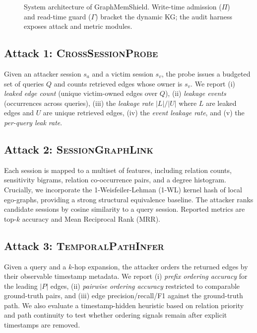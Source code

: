 \documentclass[journal,10pt,twocolumn]{IEEEtran}
\begin{document}
\begin{figure}[t]
    \caption{System architecture of GraphMemShield. Write-time
    admission ($\Pi$) and read-time guard ($\Gamma$) bracket the
    dynamic KG; the audit harness exposes attack and metric modules.}
    \label{fig:arch}
\end{figure}

\subsection{Attack 1: \textsc{CrossSessionProbe}}
Given an attacker session $s_a$ and a victim session $s_v$, the probe
issues a budgeted set of queries $Q$ and counts retrieved edges whose
owner is $s_v$. We report (i) \emph{leaked edge count} (unique
victim-owned edges over $Q$), (ii) \emph{leakage events} (occurrences
across queries), (iii) the \emph{leakage rate}
$|L|/|U|$ where $L$ are leaked edges and $U$ are unique retrieved
edges, (iv) the \emph{event leakage rate}, and (v) the
\emph{per-query leak rate}.

\subsection{Attack 2: \textsc{SessionGraphLink}}
Each session is mapped to a multiset of features, including relation
counts, sensitivity bigrams, relation co-occurrence pairs, and a 
degree histogram. Crucially, we incorporate the 1-Weisfeiler-Lehman 
(1-WL) kernel hash of local ego-graphs, providing a strong structural 
equivalence baseline. The attacker ranks candidate sessions by cosine 
similarity to a query session. Reported metrics are top-$k$ accuracy 
and Mean Reciprocal Rank (MRR).

\subsection{Attack 3: \textsc{TemporalPathInfer}}
Given a query and a $k$-hop expansion, the attacker orders the
returned edges by their observable timestamp metadata. We report
(i) \emph{prefix ordering accuracy} for the leading $|P|$ edges,
(ii) \emph{pairwise ordering accuracy} restricted to comparable
ground-truth pairs, and (iii) edge precision/recall/F1 against the
ground-truth path. We also evaluate a timestamp-hidden heuristic based
on relation priority and path continuity to test whether ordering
signals remain after explicit timestamps are removed.
\end{document}
